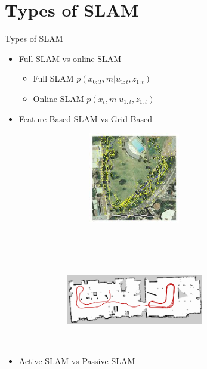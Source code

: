 \documentclass{beamer}
\begin{document}
\section{Types of SLAM}
\begin{frame}{Types of SLAM}
    \begin{itemize}
        \item Full SLAM vs online SLAM
        \begin{itemize}
            \item Full SLAM $p(x_{0:T},m|u_{1:t},z_{1:t})$
            \item Online SLAM $p(x_{t},m|u_{1:t},z_{1:t})$
        \end{itemize}
        \item Feature Based SLAM vs Grid Based
\begin{figure}
     \centering
        \begin{subfigure}[b]{0.4\textwidth}
        \hspace*{-10mm}
        \includegraphics[height = 40mm,width = 60mm]{feature_maps.jpeg}
        \end{subfigure}
    ~
        \begin{subfigure}[b]{0.4\textwidth}
        \centering
        \includegraphics[height = 40mm,width = 60mm]{gridMap.png}
        \end{subfigure}
    \end{figure}   

        \item Active SLAM vs Passive SLAM
    \end{itemize}
\end{frame}
\end{document}
